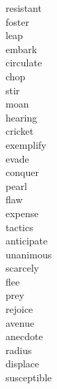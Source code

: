 \documentclass[a4paper, 11pt]{ctexart}
\begin{document}
\begin{multicols*}{3}
\begin{description}
\item[resistant]

\item[foster]

\item[leap]

\item[embark]

\item[circulate]

\item[chop]

\item[stir]

\item[moan]

\item[hearing]

\item[cricket]

\item[exemplify]

\item[evade]

\item[conquer]

\item[pearl]

\item[flaw]

\item[expense]

\item[tactics]

\item[anticipate]

\item[unanimous]

\item[scarcely]

\item[flee]

\item[prey]

\item[rejoice]

\item[avenue]

\item[anecdote]

\item[radius]

\item[displace]

\item[susceptible]


\end{description}
\end{multicols*}
\end{document}
